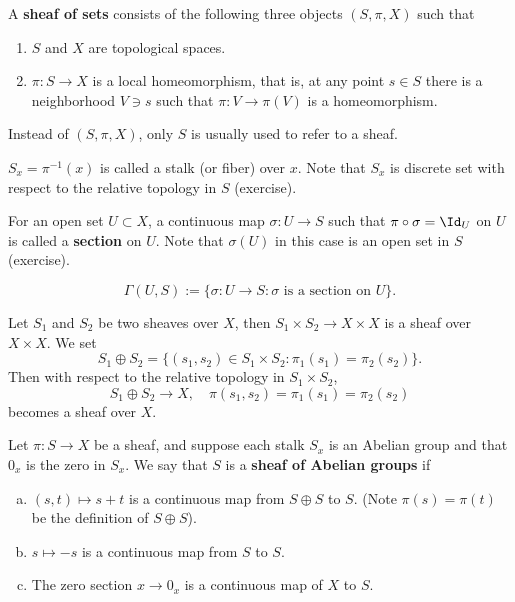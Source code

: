 \documentclass[12pt]{article}
\begin{document}
\begin{definition}
  A \textbf{sheaf of sets} consists of the following three objects \((S,\pi,X)\) such
  that
  \begin{enumerate}[1.]
  \item \(S\) and \(X\) are topological spaces.
  \item \(\pi\colon S\to X\) is a local homeomorphism, that is, at any point \(s\in S\)
    there is a neighborhood \(V\ni s\) such that \(\pi\colon V\to \pi(V)\) is
    a homeomorphism.
  \end{enumerate}
\end{definition}
\begin{remark}
  Instead of \((S,\pi,X)\), only \(S\) is usually used to refer to a sheaf.
\end{remark}

\begin{definition}
  \(S_x=\pi^{-1}(x)\) is called a stalk (or fiber) over \(x\). Note that \(S_x\) is
  discrete set with respect to the relative topology in \(S\) (exercise).
\end{definition}
\begin{remark}
  For an open set \(U\subset X\), a continuous map \(\sigma\colon U\to S\) such that
  \(\pi\circ \sigma=\Id_U\) on \(U\) is called a \textbf{section} on \(U\).
  Note that \(\sigma(U)\) in this case is an open set in \(S\) (exercise).
\end{remark}

\begin{definition}
  \[
    \Gamma(U,S):=\{\sigma\colon U\to S:\sigma \text{ is a section on }U\}.
  \]
\end{definition}

Let \(S_1\) and \(S_2\) be two sheaves over \(X\), then \(S_1\times S_2\to X\times X\)
is a sheaf over \(X\times X\). We set \[
  S_1\oplus S_2=\{(s_1,s_2)\in S_1\times S_2:\pi_1(s_1)=\pi_2(s_2)\}
.\] Then with respect to the relative topology in \(S_1\times S_2\), \[
  S_1\oplus S_2\to X,\quad\pi(s_1,s_2)=\pi_1(s_1)=\pi_2(s_2)
\] becomes a sheaf over \(X\).

Let \(\pi\colon S\to X\) be a sheaf, and suppose each stalk \(S_x\) is an Abelian
group and that \(0_x\) is the zero in \(S_x\). We say that \(S\) is a \textbf{sheaf of
Abelian groups} if 
\begin{enumerate}[(a)]
\item \((s,t)\mapsto s+t\) is a continuous map from \(S\oplus S\) to \(S\). (Note 
  \(\pi(s)=\pi(t)\) be the definition of \(S\oplus S\)).
\item \(s\mapsto -s\) is a continuous map from \(S\) to \(S\).
\item The zero section \(x\to 0_x\) is a continuous map of \(X\) to \(S\).
\end{enumerate}
\end{document}
